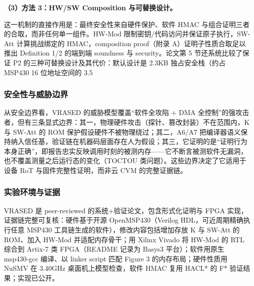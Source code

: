 \documentclass[11pt]{ctexart}
\begin{document}
\noindent\textbf{（3）方法 3：HW/SW Composition 与可替换设计。}\par
这一机制的直接作用是：最终安全性来自硬件保护、软件 HMAC 与组合证明三者的合取，而非任何单一组件。HW-Mod 限制密钥/代码访问并保证原子执行，SW-Att 计算挑战绑定的 HMAC，composition proof（附录 A）证明子性质合取足以推出 Definition 1/2 的端到端 soundness 与 security。论文第 5 节还系统比较了保证 P2 的三种可替换设计及其代价：默认设计是 2.3KB 独占安全栈（约占 MSP430 16 位地址空间的 3.5%
\subsubsection{安全性与威胁边界}
从安全边界看，VRASED 的威胁模型覆盖“软件全攻陷 + DMA 全控制”的强攻击者，但有三条显式边界：其一，物理硬件攻击（探针、篡改封装）不在范围内，K 与 SW-Att 的 ROM 保护假设硬件不被物理绕过；其二，A6/A7 把编译器语义保持纳入信任基，验证链在机器码层面存在人为假设；其三，它证明的是“证明行为本身正确”，即报告忠实反映调用时刻的被测内存——它不断言被测软件无漏洞，也不覆盖测量之后运行态的变化（TOCTOU 类问题）。这些边界决定了它适用于设备 RoT 与固件完整性证明，而非云 CVM 的完整证据链。\par
\subsubsection{实验环境与证据}
VRASED 是 peer-reviewed 的系统+验证论文，包含形式化证明与 FPGA 实现，证据链完整可复核：硬件基于开源 OpenMSP430（Verilog HDL，可近周期精确执行任意 MSP430 工具链生成的软件），修改内容包括增加存放 K 与 SW-Att 的 ROM、加入 HW-Mod 并适配内存骨干；用 Xilinx Vivado 将 HW-Mod 的 RTL 综合到 Artix-7 类 FPGA（README 记录为 Basys3 平台）；软件用原生 msp430-gcc 编译、以 linker script 匹配 Figure 3 的内存布局；硬件性质用 NuSMV 在 3.40GHz 桌面机上模型检查，软件 HMAC 复用 HACL* 的 F* 验证结果；实现已公开。\par
\end{document}
